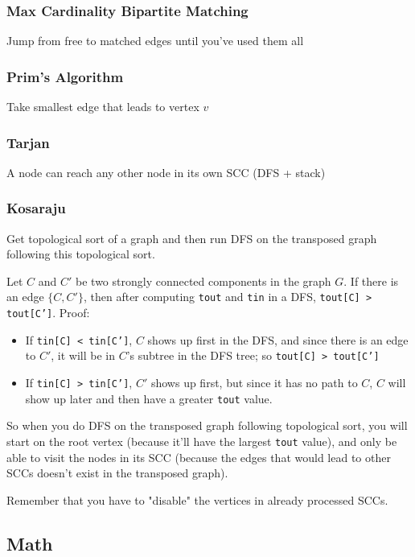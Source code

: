\documentclass[12pt, a4paper, twoside]{article}
\begin{document}
\subsubsection{Max Cardinality Bipartite Matching}
Jump from free to matched edges until you've used them all

\subsubsection{Prim's Algorithm}
Take smallest edge that leads to vertex $v$

\subsubsection{Tarjan}
A node can reach any other node in its own SCC (DFS + stack)

\subsubsection{Kosaraju}
Get topological sort of a graph and then run DFS on the transposed graph following this topological sort.

Let $C$ and $C'$ be two strongly connected components in the graph $G$. If there is an edge $\{C, C'\}$, then after computing \texttt{tout} and \texttt{tin} in a DFS, \texttt{tout[C] > tout[C']}. Proof:
\begin{itemize}
  \item If \texttt{tin[C] < tin[C']}, $C$ shows up first in the DFS, and since there is an edge to $C'$, it will be in $C$'s subtree in the DFS tree; so \texttt{tout[C] > tout[C']}
  \item If \texttt{tin[C] > tin[C']}, $C'$ shows up first, but since it has no path to $C$, $C$ will show up later and then have a greater \texttt{tout} value.
\end{itemize}

So when you do DFS on the transposed graph following topological sort, you will start on the root vertex (because it'll have the largest \texttt{tout} value), and only be able to visit the nodes in its SCC (because the edges that would lead to other SCCs doesn't exist in the transposed graph).

Remember that you have to "disable" the vertices in already processed SCCs.

\subsection{Math}
\end{document}
